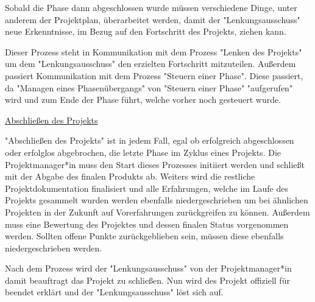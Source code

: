 Sobald die Phase dann abgeschlossen wurde müssen verschiedene Dinge, unter anderem der Projektplan, überarbeitet werden, damit der "Lenkungsausschuss" neue Erkenntnisse, im Bezug auf den Fortschritt des Projekts, ziehen kann. \cite{Prince2}

Dieser Prozess steht in Kommunikation mit dem Prozess "Lenken des Projekts" um dem "Lenkungsausschuss" den erzielten Fortschritt mitzuteilen. Außerdem passiert Kommunikation mit dem Prozess "Steuern einer Phase". Diese passiert, da "Managen eines Phasenübergangs" von "Steuern einer Phase" "aufgerufen" wird und zum Ende der Phase führt, welche vorher noch gesteuert wurde. \cite{Prince2}

\underline{Abschließen des Projekts}

"Abschließen des Projekts" ist in jedem Fall, egal ob erfolgreich abgeschlossen oder erfolglos abgebrochen, die letzte Phase im Zyklus eines Projekts. Die Projektmanager*in muss den Start dieses Prozesses initiiert werden und schließt mit der Abgabe des finalen Produkts ab. Weiters wird die restliche Projektdokumentation finalisiert und alle Erfahrungen, welche im Laufe des Projekts gesammelt wurden werden ebenfalls niedergeschrieben um bei ähnlichen Projekten in der Zukunft auf Vorerfahrungen zurückgreifen zu können. Außerdem muss eine Bewertung des Projektes und dessen finalen Status vorgenommen werden. Sollten offene Punkte zurückgeblieben sein, müssen diese ebenfalls niedergeschrieben werden. \cite{Prince2}

Nach dem Prozess wird der "Lenkungsausschuss" von der Projektmanager*in damit beauftragt das Projekt zu schließen. Nun wird des Projekt offiziell für beendet erklärt und der "Lenkungsausschuss" löst sich auf. \cite{Prince2}
